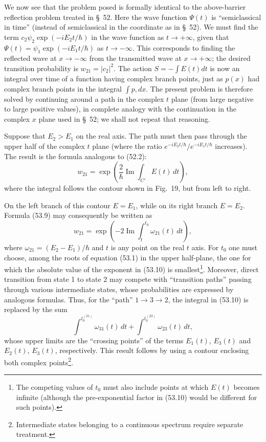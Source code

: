 We now see that the problem posed is formally identical to the above-barrier reflection problem treated in §~52. Here the wave function $\Psi(t)$ is ``semiclassical in time'' (instead of semiclassical in the coordinate as in §~52). We must find the term $c_2\psi_2\exp(-iE_2t/\hbar)$ in the wave function as $t\to+\infty$, given that $\Psi(t)=\psi_1\exp(-iE_1t/\hbar)$ as $t\to-\infty$. This corresponds to finding the reflected wave at $x\to-\infty$ from the transmitted wave at $x\to+\infty$; the desired transition probability is $w_{21}=|c_2|^2$. The action $S=-\int E(t)dt$ is now an integral over time of a function having complex branch points, just as $p(x)$ had complex branch points in the integral $\int p,dx$. The present problem is therefore solved by continuing around a path in the complex $t$ plane (from large negative to large positive values), in complete analogy with the continuation in the complex $x$ plane used in §~52; we shall not repeat that reasoning.

Suppose that $E_2>E_1$ on the real axis. The path must then pass through the upper half of the complex
$t$ plane (where the ratio $e^{-iE_2t/\hbar}/e^{-iE_1t/\hbar}$ increases). The result is the formula analogous to (52.2):
\begin{equation}
 w_{21}=\exp\left(\frac2\hbar\operatorname{Im}\int_{C'}E(t)\,dt\right),
 \tag{53.9}
\end{equation}
where the integral follows the contour shown in Fig.~19, but from left to right.

On the left branch of this contour $E=E_1$, while on its right branch $E=E_2$. Formula (53.9) may consequently be written as
\begin{equation}
 w_{21}=\exp\left(-2\operatorname{Im}\int_t^{t_0}\omega_{21}(t)\,dt\right),
 \tag{53.10}
\end{equation}
where $\omega_{21}=(E_2-E_1)/\hbar$ and $t$ is any point on the real $t$ axis. For $t_0$ one must choose, among the roots of equation (53.1) in the upper half-plane, the one for which the absolute value of the exponent in (53.10) is smallest\footnote{The competing values of $t_0$ must also include points at which $E(t)$ becomes infinite (although the pre-exponential factor in (53.10) would be different for such points).}. Moreover, direct transition from state 1 to state 2 may compete with ``transition paths'' passing through various intermediate states, whose probabilities are expressed by analogous formulas. Thus, for the ``path'' $1\to3\to2$, the integral in (53.10) is replaced by the sum
\[
 \int^{t_0^{(31)}}\omega_{31}(t)\,dt+
 \int^{t_0^{(23)}}\omega_{23}(t)\,dt,
\]
whose upper limits are the ``crossing points'' of the terms $E_1(t)$, $E_3(t)$ and $E_2(t)$, $E_3(t)$, respectively. This result follows by using a contour enclosing both complex points\footnote{Intermediate states belonging to a continuous spectrum require separate treatment.}.

